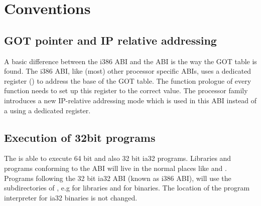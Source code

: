 
\chapter{Conventions}



\section{GOT pointer and IP relative addressing}

A basic difference between the i386 ABI and the \xARCH ABI is the
way the GOT table is found.  The i386 ABI, like (most) other processor
specific ABIs, uses a dedicated register () to address the
base of the GOT table.  The function prologue of every function needs
to set up this register to the correct value.  The \xARCH processor
family introduces a new IP-relative addressing mode which is used in
this ABI instead of a using a dedicated register.

\section{Execution of 32bit programs}

The \xARCH is able to execute 64 bit \xARCH and also 32 bit ia32
programs.  Libraries and programs conforming to the \xARCH ABI will
live in the normal places like  and .
Programs following the 32 bit ia32 ABI (known as i386 ABI), will use
the subdirectories of , e.g  for
libraries and  for binaries.  The location of the
program interpreter for ia32 binaries is not changed.


